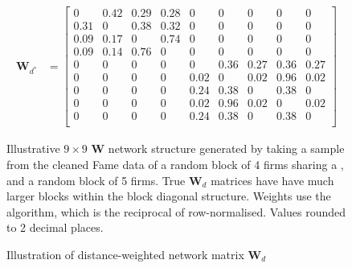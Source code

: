 \begin{figure}[hbtp]
    \caption{Illustration of distance-weighted network matrix $\mathbf W_d$}
    \label{fig:static-network-4x5-Wd}
    \centering
    \par\noindent
    \begin{align*}
        \mathbf W_{d^*}
        &=
        \begin{bmatrix}
            0 & 0.42 & 0.29 & 0.28 & 0 & 0 & 0 & 0 & 0 \\
            0.31 & 0 & 0.38 & 0.32 & 0 & 0 & 0 & 0 & 0 \\
            0.09 & 0.17 & 0 & 0.74 & 0 & 0 & 0 & 0 & 0 \\
            0.09 & 0.14 & 0.76 & 0 & 0 & 0 & 0 & 0 & 0 \\
            0 & 0 & 0 & 0 & 0 & 0.36 & 0.27 & 0.36 & 0.27 \\
            0 & 0 & 0 & 0 & 0.02 & 0 & 0.02 & 0.96 & 0.02 \\
            0 & 0 & 0 & 0 & 0.24 & 0.38 & 0 & 0.38 & 0 \\
            0 & 0 & 0 & 0 & 0.02 & 0.96 & 0.02 & 0 & 0.02 \\
            0 & 0 & 0 & 0 & 0.24 & 0.38 & 0 & 0.38 & 0 \\
        \end{bmatrix}
    \end{align*}
    \begin{tablenotes}
        Illustrative $9\times 9$ $\mathbf W$ network structure
        generated by taking a sample from the cleaned Fame data
        of a random block of 4 firms sharing a ,
        and a random block of 5 firms.
        True $\mathbf W_d$ matrices have  have much larger blocks
        within the block diagonal structure.
        Weights use the  algorithm,
        which is the reciprocal of  row-normalised.
        Values rounded to 2 decimal places.
    \end{tablenotes}
\end{figure}

